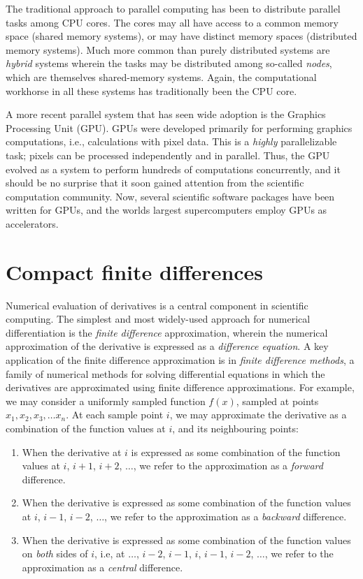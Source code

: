 The traditional approach to parallel computing has been
to distribute parallel tasks among CPU cores.
The cores may all have access to a common memory space
(shared memory systems),
or may have distinct memory spaces
(distributed memory systems).
Much more common than purely distributed systems are
\emph{hybrid} systems wherein the tasks may be distributed
among so-called \emph{nodes},
which are themselves shared-memory systems.
Again, the computational workhorse in all these systems has traditionally
been the CPU core.

A more recent parallel system that has seen
wide adoption
is the Graphics Processing Unit (GPU).
GPUs were developed primarily for performing
graphics computations, i.e.,
calculations with pixel data.
This is a \emph{highly} parallelizable task;
pixels can be processed independently and in parallel.
Thus, the GPU evolved as a system
to perform hundreds of computations concurrently,
and it should be no surprise that it soon
gained attention from the scientific computation community.
Now, several scientific software packages have been
written for GPUs,
and the worlds largest supercomputers employ GPUs
as accelerators.


\section{Compact finite differences}

Numerical evaluation of derivatives is a central component
in scientific computing.
The simplest and most widely-used approach for numerical differentiation
is the \emph{finite difference} approximation,
wherein the numerical approximation of the derivative
is expressed as a \emph{difference equation}.
A key application of the finite difference approximation
is in \emph{finite difference methods},
a family of numerical methods for solving differential equations
in which the derivatives are approximated using
finite difference approximations.
%
For example, we may consider a uniformly sampled
function $f(x)$,
sampled at points $x_1, x_2, x_3, \hdots x_n$.
At each sample point $i$, we may approximate the derivative as
a combination of the function values at
$i$, and its neighbouring points:

\begin{enumerate}
    \item When the derivative at $i$ is expressed
        as some combination of the function values
        at $i$, $i+1$, $i+2$, $\hdots$,
        we refer to the approximation as a
        \emph{forward} difference.
        
    \item When the derivative is expressed as
        some combination of the function values
        at $i$, $i-1$, $i-2$, $\hdots$,
        we refer to the approximation as a
        \emph{backward} difference.

    \item When the derivative is expressed as
        some combination of the function values
        on \emph{both} sides of $i$, i.e,
        at $\hdots$, $i-2$, $i-1$, $i$, $i-1$, $i-2$, $\hdots$,
        we refer to the approximation as a
        \emph{central} difference.
\end{enumerate}

